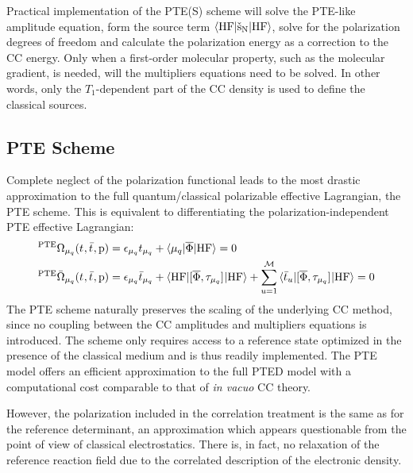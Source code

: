 Practical implementation of the \acrshort{PTE(S)} scheme will solve the
\acrshort{PTE}-like amplitude equation, form the source term
$\braket{\mathrm{HF} | \check{\mathrm{s}}_\mathrm{N} | \mathrm{HF}}$, solve for
the polarization degrees of freedom and calculate the polarization
energy as a correction to the \acrshort{CC} energy.
Only when a first-order molecular property, such as the molecular
gradient, is needed, will the multipliers equations need to be solved.
In other words, only the $T_1$-dependent part of the \acrshort{CC} density is
used to define the classical sources.

\subsection*{PTE Scheme}

Complete neglect of the polarization functional leads to the most
drastic approximation to the full quantum/classical polarizable
effective Lagrangian, the \acrshort{PTE} scheme.
This is equivalent to differentiating the polarization-independent
\acrshort{PTE} effective Lagrangian:
\begin{subequations}
  \begin{align}
 {}^{\mathrm{PTE}}\Omega_{\mu_q}(t_{}, \bar{t}_{}, \mathrm{p})  &=
   \epsilon_{\mu_q}t_{\mu_q} + \braket{\mu_q | \overline{\Phi} | \mathrm{HF}}
    = 0 \\
   {}^{\mathrm{PTE}}\bar{\Omega}_{\mu_q}(t_{}, \bar{t}_{}, \mathrm{p})
    &=
    \epsilon_{\mu_q}\bar{t}_{\mu_q} +
    \braket{\mathrm{HF} | [ \overline{\Phi}, \tau_{\mu_q} ]^{} | \mathrm{HF}} +
    \sum_{u=1}^{\mathcal{M}}\braket{\bar{t}_{u} |
    [ \overline{\Phi}, \tau_{\mu_q} ]^{} | \mathrm{HF}}
    = 0
  \end{align}
\end{subequations}
The \acrshort{PTE} scheme naturally preserves the scaling of the underlying
\acrshort{CC} method, since no coupling between the \acrshort{CC} amplitudes and
multipliers equations is introduced.
The scheme only requires access to a
reference state optimized in the presence of the classical medium and is
thus readily implemented.
The \acrshort{PTE} model offers an efficient approximation to the full
\acrshort{PTED} model with a computational cost comparable to that of
\emph{in vacuo} \acrshort{CC}
theory.\autocite{Olivares_del_Valle1991-of, Begue2005-qn,
Hasegawa2007-jt}

However, the polarization included in the correlation treatment is the
same as for the reference determinant, an approximation which appears
questionable from the point of view of classical electrostatics. There
is, in fact, no relaxation of the reference reaction field due to the
correlated description of the electronic density.

